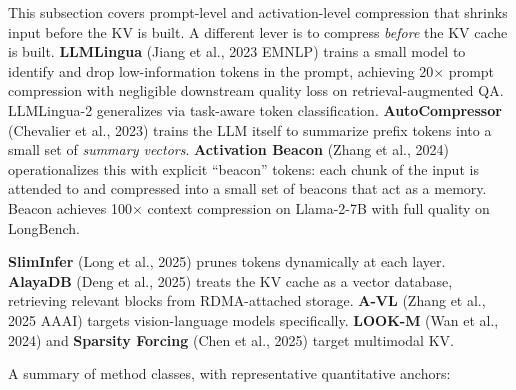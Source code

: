 This subsection covers prompt-level and activation-level compression that shrinks input before the KV is built. A different lever is to compress \emph{before} the KV cache is built. \textbf{LLMLingua} (Jiang et al., 2023 EMNLP) trains a small model to identify and drop low-information tokens in the prompt, achieving 20× prompt compression with negligible downstream quality loss on retrieval-augmented QA. LLMLingua-2 generalizes via task-aware token classification. \textbf{AutoCompressor} (Chevalier et al., 2023) trains the LLM itself to summarize prefix tokens into a small set of \emph{summary vectors}. \textbf{Activation Beacon} (Zhang et al., 2024) operationalizes this with explicit ``beacon'' tokens: each chunk of the input is attended to and compressed into a small set of beacons that act as a memory. Beacon achieves 100× context compression on Llama-2-7B with full quality on LongBench.

\textbf{SlimInfer} (Long et al., 2025) prunes tokens dynamically at each layer. \textbf{AlayaDB} (Deng et al., 2025) treats the KV cache as a vector database, retrieving relevant blocks from RDMA-attached storage. \textbf{A-VL} (Zhang et al., 2025 AAAI) targets vision-language models specifically. \textbf{LOOK-M} (Wan et al., 2024) and \textbf{Sparsity Forcing} (Chen et al., 2025) target multimodal KV.

A summary of method classes, with representative quantitative anchors:

